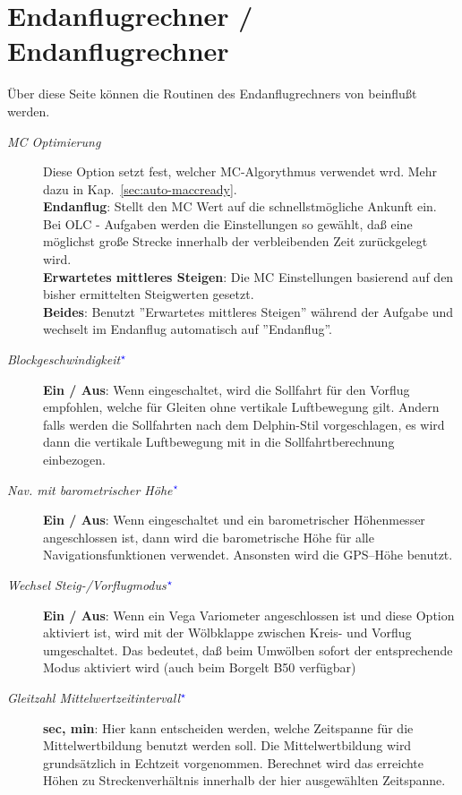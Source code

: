 \section{Endanflugrechner / Endanflugrechner}\label{sec:final-glide}
Über diese Seite können die Routinen des Endanflugrechners von \xc  beinflußt werden.

\begin{description}
\item[\textit{MC Optimierung}]  Diese Option setzt fest, welcher MC-Algorythmus verwendet wrd.
Mehr dazu in Kap.~\ref{sec:auto-maccready}. \\
   {\bf Endanflug}: Stellt den MC Wert auf die schnellstmögliche Ankunft ein.
   Bei OLC - Aufgaben werden die Einstellungen  so gewählt, daß  eine möglichst große Strecke innerhalb der verbleibenden Zeit zurückgelegt wird.\\
   {\bf Erwartetes mittleres Steigen}: Die MC Einstellungen basierend auf den bisher ermittelten Steigwerten gesetzt.\\
   {\bf Beides}: Benutzt ''Erwartetes mittleres Steigen'' während der Aufgabe und wechselt im Endanflug automatisch auf  ''Endanflug''.
\item[\textit{Blockgeschwindigkeit$^{\textcolor{blue}{\star}}$}] {\bf Ein / Aus}: Wenn eingeschaltet, wird die Sollfahrt für den Vorflug empfohlen, welche für Gleiten ohne vertikale Luftbewegung gilt.
Andern falls werden die Sollfahrten nach dem Delphin-Stil vorgeschlagen, es wird dann die vertikale Luftbewegung mit in die Sollfahrtberechnung
einbezogen.
\item[\textit{Nav. mit barometrischer Höhe$^{\textcolor{blue}{\star}}$}] {\bf Ein / Aus}: Wenn eingeschaltet und ein barometrischer Höhenmesser angeschlossen ist, dann wird die barometrische Höhe für alle Navigationsfunktionen verwendet. Ansonsten wird die GPS--Höhe benutzt.
\item[\textit{Wechsel Steig-/Vorflugmodus$^{\textcolor{blue}{\star}}$}] {\bf Ein / Aus}: Wenn ein Vega Variometer angeschlossen ist und diese Option aktiviert ist, wird mit der Wölbklappe zwischen Kreis- und Vorflug umgeschaltet.
Das bedeutet, daß  beim Umwölben sofort der entsprechende Modus aktiviert wird (auch beim Borgelt B50 verfügbar)
\item[\textit{Gleitzahl Mittelwertzeitintervall$^{\textcolor{blue}{\star}}$}] {\bf sec, min}: Hier kann entscheiden werden, welche Zeitspanne für die Mittelwertbildung benutzt werden soll.
Die Mittelwertbildung wird grundsätzlich in Echtzeit vorgenommen. Berechnet wird das erreichte Höhen zu Streckenverhältnis
innerhalb der hier ausgewählten Zeitspanne.


\end{description}
